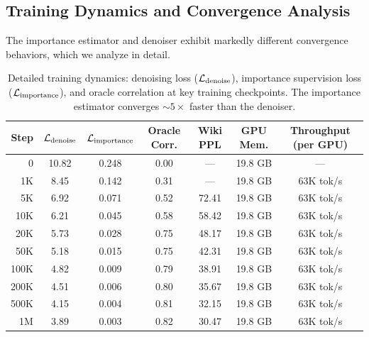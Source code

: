 \subsection{Training Dynamics and Convergence Analysis}

The importance estimator and denoiser exhibit markedly different convergence behaviors, which we analyze in detail.

\begin{table}[h]
\centering
\caption{Detailed training dynamics: denoising loss ($\mathcal{L}_{\text{denoise}}$), importance supervision loss ($\mathcal{L}_{\text{importance}}$), and oracle correlation at key training checkpoints. The importance estimator converges ${\sim}5\times$ faster than the denoiser.}
\label{tab:training-dynamics}
\begin{tabular}{rcccccc}
\toprule
\textbf{Step} & $\mathcal{L}_{\text{denoise}}$ & $\mathcal{L}_{\text{importance}}$ & \textbf{Oracle Corr.} & \textbf{Wiki PPL} & \textbf{GPU Mem.} & \textbf{Throughput (per GPU)} \\
\midrule
0 & 10.82 & 0.248 & 0.00 & --- & 19.8 GB & --- \\
1K & 8.45 & 0.142 & 0.31 & --- & 19.8 GB & 63K tok/s \\
5K & 6.92 & 0.071 & 0.52 & 72.41 & 19.8 GB & 63K tok/s \\
10K & 6.21 & 0.045 & 0.58 & 58.42 & 19.8 GB & 63K tok/s \\
20K & 5.73 & 0.028 & 0.75 & 48.17 & 19.8 GB & 63K tok/s \\
50K & 5.18 & 0.015 & 0.75 & 42.31 & 19.8 GB & 63K tok/s \\
100K & 4.82 & 0.009 & 0.79 & 38.91 & 19.8 GB & 63K tok/s \\
200K & 4.51 & 0.006 & 0.80 & 35.67 & 19.8 GB & 63K tok/s \\
500K & 4.15 & 0.004 & 0.81 & 32.15 & 19.8 GB & 63K tok/s \\
1M & 3.89 & 0.003 & 0.82 & 30.47 & 19.8 GB & 63K tok/s \\
\bottomrule
\end{tabular}
\end{table}

